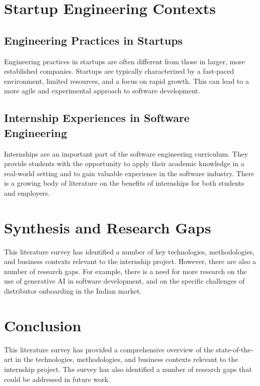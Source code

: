 \section{Startup Engineering Contexts}

\subsection{Engineering Practices in Startups}
Engineering practices in startups are often different from those in larger, more established companies. Startups are typically characterized by a fast-paced environment, limited resources, and a focus on rapid growth. This can lead to a more agile and experimental approach to software development.

\subsection{Internship Experiences in Software Engineering}
Internships are an important part of the software engineering curriculum. They provide students with the opportunity to apply their academic knowledge in a real-world setting and to gain valuable experience in the software industry. There is a growing body of literature on the benefits of internships for both students and employers.

\section{Synthesis and Research Gaps}
This literature survey has identified a number of key technologies, methodologies, and business contexts relevant to the internship project. However, there are also a number of research gaps. For example, there is a need for more research on the use of generative AI in software development, and on the specific challenges of distributor onboarding in the Indian market.

\section{Conclusion}
This literature survey has provided a comprehensive overview of the state-of-the-art in the technologies, methodologies, and business contexts relevant to the internship project. The survey has also identified a number of research gaps that could be addressed in future work.
